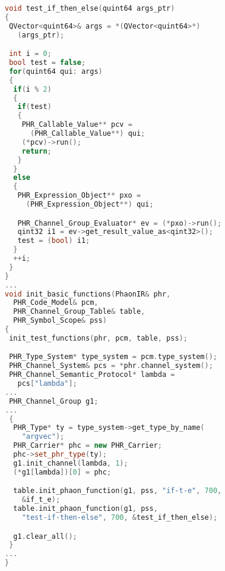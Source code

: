 \begin{figure} 
\begin{lstlisting}[caption={%
\emblink{\#lst--ifte--\thelstlisting.pgvm-pdf}{Implementing If/Then/Else Blocks}},
  language = C++, numbers = none, escapechar = !,label={lst:ifte},
    basicstyle = \ttfamily\bfseries\footnotesize, linewidth = \linewidth]
void test_if_then_else(quint64 args_ptr)
{
 QVector<quint64>& args = *(QVector<quint64>*)
   (args_ptr);

 int i = 0;
 bool test = false;
 for(quint64 qui: args)
 {
  if(i % 2)
  {
   if(test)
   {
    PHR_Callable_Value** pcv = 
      (PHR_Callable_Value**) qui;
    (*pcv)->run();
    return;
   }
  }
  else
  {
   PHR_Expression_Object** pxo = 
     (PHR_Expression_Object**) qui;

   PHR_Channel_Group_Evaluator* ev = (*pxo)->run();
   qint32 i1 = ev->get_result_value_as<qint32>();
   test = (bool) i1;
  }
  ++i;
 }
}
...
void init_basic_functions(PhaonIR& phr, 
  PHR_Code_Model& pcm, 
  PHR_Channel_Group_Table& table, 
  PHR_Symbol_Scope& pss)
{
 init_test_functions(phr, pcm, table, pss);

 PHR_Type_System* type_system = pcm.type_system();
 PHR_Channel_System& pcs = *phr.channel_system();
 PHR_Channel_Semantic_Protocol* lambda = 
   pcs["lambda"];
...
 PHR_Channel_Group g1;
...
 {
  PHR_Type* ty = type_system->get_type_by_name(
    "argvec");
  PHR_Carrier* phc = new PHR_Carrier;
  phc->set_phr_type(ty);
  g1.init_channel(lambda, 1);
  (*g1[lambda])[0] = phc;

  table.init_phaon_function(g1, pss, "if-t-e", 700, 
    &if_t_e);
  table.init_phaon_function(g1, pss, 
    "test-if-then-else", 700, &test_if_then_else);

  g1.clear_all();
 }
...
}

\end{lstlisting}

\end{figure} 
